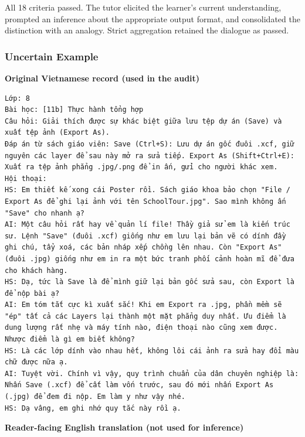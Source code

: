 \documentclass[conference]{IEEEtran}
\begin{document}
All 18 criteria passed. The tutor elicited the learner's current understanding, prompted an inference about the appropriate output format, and consolidated the distinction with an analogy. Strict aggregation retained the dialogue as passed.

\subsubsection{Uncertain Example}
\noindent\textbf{Original Vietnamese record (used in the audit)}
\begin{Verbatim}[breaklines=true,breakanywhere=true,fontsize=\footnotesize,formatcom=\rmfamily]
Lớp: 8
Bài học: [11b] Thực hành tổng hợp
Câu hỏi: Giải thích được sự khác biệt giữa lưu tệp dự án (Save) và xuất tệp ảnh (Export As).
Đáp án từ sách giáo viên: Save (Ctrl+S): Lưu dự án gốc đuôi .xcf, giữ nguyên các layer để sau này mở ra sửa tiếp. Export As (Shift+Ctrl+E): Xuất ra tệp ảnh phẳng .jpg/.png để in ấn, gửi cho người khác xem.
Hội thoại:
HS: Em thiết kế xong cái Poster rồi. Sách giáo khoa bảo chọn "File / Export As để ghi lại ảnh với tên SchoolTour.jpg". Sao mình không ấn "Save" cho nhanh ạ?
AI: Một câu hỏi rất hay về quản lí file! Thầy giả sử em là kiến trúc sư. Lệnh "Save" (đuôi .xcf) giống như em lưu lại bản vẽ có dính đầy ghi chú, tẩy xoá, các bản nháp xếp chồng lên nhau. Còn "Export As" (đuôi .jpg) giống như em in ra một bức tranh phối cảnh hoàn mĩ để đưa cho khách hàng.
HS: Dạ, tức là Save là để mình giữ lại bản gốc sửa sau, còn Export là để nộp bài ạ?
AI: Em tóm tắt cực kì xuất sắc! Khi em Export ra .jpg, phần mềm sẽ "ép" tất cả các Layers lại thành một mặt phẳng duy nhất. Ưu điểm là dung lượng rất nhẹ và máy tính nào, điện thoại nào cũng xem được. Nhược điểm là gì em biết không?
HS: Là các lớp dính vào nhau hết, không lôi cái ảnh ra sửa hay đổi màu chữ được nữa ạ.
AI: Tuyệt vời. Chính vì vậy, quy trình chuẩn của dân chuyên nghiệp là: Nhấn Save (.xcf) để cất làm vốn trước, sau đó mới nhấn Export As (.jpg) để đem đi nộp. Em làm y như vậy nhé.
HS: Dạ vâng, em ghi nhớ quy tắc này rồi ạ.
\end{Verbatim}
\noindent\textbf{Reader-facing English translation (not used for inference)}
\end{document}
